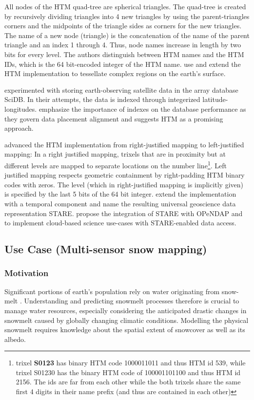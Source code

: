 \documentclass[a4paper,10pt]{article}
\begin{document}
All nodes of the \gls{HTM} quad-tree are spherical triangles. The quad-tree is created by recursively dividing triangles into 4 new triangles by using the parent-triangles corners and the midpoints of the triangle sides as corners for the new triangles.
The name of a new node (triangle) is the concatenation of the name of the parent triangle and an index 1 through 4. Thus, node names increase in length by two bits for every level. The authors distinguish between \gls{HTM} names and the \gls{HTM} IDs, which is the 64 bit-encoded integer of the \gls{HTM} name. 
\cite{Kondor2014} use and extend the \gls{HTM} implementation to tessellate complex regions on the earth's surface.

\cite{Planthaber2012, Planthaber2012b, Krcal2015, Hausen2016, Doan2016} experimented with storing earth-observing satellite data in the array database SciDB. In their attempts, the data is indexed through integerized latitude-longitudes. \cite{Doan2016} emphasize the importance of indexes on the database performance as they govern data placement alignment and suggests \gls{HTM} as a promising approach.

\cite{Rilee2016} advanced the HTM implementation from right-justified mapping to left-justified mapping:
In a right justified mapping, trixels that are in proximity but at different levels are mapped to separate locations on the number line\footnote{trixel \textbf{S0123} has binary HTM code 1000011011 and thus HTM id 539, while trixel S01230 has the binary HTM code of 100001101100 and thus HTM id 2156. The ids are far from each other while the both trixels share the same first 4 digits in their name prefix (and thus are contained in each other)}.
Left justified mapping respects geometric containment by right-padding HTM binary codes with zeros.
The level (which in right-justified mapping is implicitly given) is specified by the last 5 bits of the 64 bit integer.
\cite{Kuo2017} extend the implementation with a temporal component and name the resulting universal geoscience data representation \gls{STARE}.
\cite{Rilee2018} propose the integration of \gls{STARE} with \gls{OPeNDAP} and to implement cloud-based science use-cases with \gls{STARE}-enabled data access.

\newpage

\subsection{Use Case (Multi-sensor snow mapping)}

\subsubsection{Motivation}
Significant portions of earth's population rely on water originating from snow-melt \citep{Barnett2005}.
Understanding and predicting snowmelt processes therefore is crucial to manage water resources, especially considering the anticipated drastic changes in snowmelt caused by globally changing climatic conditions. Modelling the physical snowmelt requires knowledge about the spatial extent of snowcover as well as its albedo.
\end{document}
